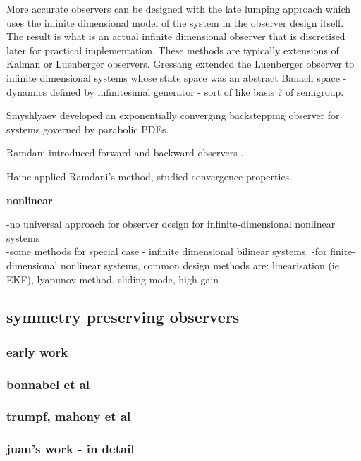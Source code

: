 More accurate observers can be designed with the late lumping approach which uses the infinite dimensional model of the system in the observer design itself. The result is what is an actual infinite dimensional observer that is discretised later for practical implementation. These methods are typically extensions of Kalman or Luenberger observers. 
Gressang \cite{gressang1975observers} extended the Luenberger observer to infinite dimensional systems whose state space was an abstract Banach space - dynamics defined by infinitesimal generator - sort of like basis ? of semigroup.

Smyshlyaev \cite{smyshlyaev2005backstepping} developed an exponentially converging backstepping observer for systems governed by parabolic PDEs.

Ramdani introduced forward and backward observers \cite{ramdani2010recovering}.

Haine \cite{haine2014recovering} applied Ramdani's method, studied convergence properties.

\textbf{nonlinear}

-no universal approach for observer design for infinite-dimensional nonlinear systems\\
-some methods for special case - infinite dimensional bilinear systems. \cite{xu1995observer,bounit1997observers}
-for finite-dimensional nonlinear systems, common design methods are: linearisation (ie EKF), lyapunov method, sliding mode, high gain

\subsection{symmetry preserving observers}
\subsubsection{early work}
\subsubsection{bonnabel et al}
\subsubsection{trumpf, mahony et al}
\subsubsection{juan's work - in detail}

